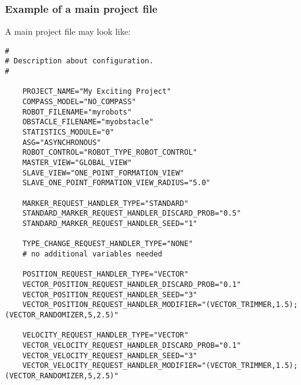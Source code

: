 \subsubsection{Example of a main project file}
A main project file may look like:
\lstset{language=tcl}
\begin{lstlisting}
# 
# Description about configuration.
#
	
	PROJECT_NAME="My Exciting Project"
	COMPASS_MODEL="NO_COMPASS"
	ROBOT_FILENAME="myrobots"
	OBSTACLE_FILENAME="myobstacle"
	STATISTICS_MODULE="0"
	ASG="ASYNCHRONOUS"
	ROBOT_CONTROL="ROBOT_TYPE_ROBOT_CONTROL"
	MASTER_VIEW="GLOBAL_VIEW"
	SLAVE_VIEW="ONE_POINT_FORMATION_VIEW"
	SLAVE_ONE_POINT_FORMATION_VIEW_RADIUS="5.0"
	
	MARKER_REQUEST_HANDLER_TYPE="STANDARD"
	STANDARD_MARKER_REQUEST_HANDLER_DISCARD_PROB="0.5"
	STANDARD_MARKER_REQUEST_HANDLER_SEED="1"

	TYPE_CHANGE_REQUEST_HANDLER_TYPE="NONE"
	# no additional variables needed

	POSITION_REQUEST_HANDLER_TYPE="VECTOR"
	VECTOR_POSITION_REQUEST_HANDLER_DISCARD_PROB="0.1"
	VECTOR_POSITION_REQUEST_HANDLER_SEED="3"
	VECTOR_POSITION_REQUEST_HANDLER_MODIFIER="(VECTOR_TRIMMER,1.5);(VECTOR_RANDOMIZER,5,2.5)"

	VELOCITY_REQUEST_HANDLER_TYPE="VECTOR"
	VECTOR_VELOCITY_REQUEST_HANDLER_DISCARD_PROB="0.1"
	VECTOR_VELOCITY_REQUEST_HANDLER_SEED="3"
	VECTOR_VELOCITY_REQUEST_HANDLER_MODIFIER="(VECTOR_TRIMMER,1.5);(VECTOR_RANDOMIZER,5,2.5)"
\end{lstlisting}



